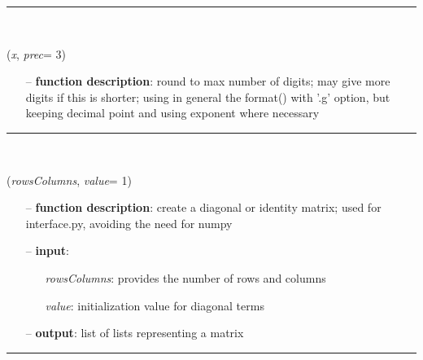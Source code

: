 \begin{itemize}[leftmargin=1.4cm]
\begin{itemize}[leftmargin=1.4cm]
\begin{itemize}[leftmargin=1.4cm]
\begin{itemize}[leftmargin=0.5cm]
%
\noindent\rule{8cm}{0.75pt}\vspace{1pt} \\ 
\begin{flushleft}
\label{sec:basicUtilities:SmartRound2String}
({\it x}, {\it prec}= 3)
\end{flushleft}
\setlength{\itemindent}{0.7cm}
\begin{itemize}[leftmargin=0.7cm]
\item[--]
{\bf function description}: round to max number of digits; may give more digits if this is shorter; using in general the format() with '.g' option, but keeping decimal point and using exponent where necessary
\vspace{12pt}\end{itemize}
%
\noindent\rule{8cm}{0.75pt}\vspace{1pt} \\ 
\begin{flushleft}
\label{sec:basicUtilities:DiagonalMatrix}
({\it rowsColumns}, {\it value}= 1)
\end{flushleft}
\setlength{\itemindent}{0.7cm}
\begin{itemize}[leftmargin=0.7cm]
\item[--]
{\bf function description}: create a diagonal or identity matrix; used for interface.py, avoiding the need for numpy
\item[--]
{\bf input}: \vspace{-6pt}
\begin{itemize}[leftmargin=1.2cm]
\setlength{\itemindent}{-0.7cm}
\item[]{\it rowsColumns}: provides the number of rows and columns
\item[]{\it value}: initialization value for diagonal terms
\end{itemize}
\item[--]
{\bf output}: list of lists representing a matrix
\vspace{12pt}\end{itemize}
%
\noindent\rule{8cm}{0.75pt}\vspace{1pt} \\ 
\begin{flushleft}
\label{sec:basicUtilities:NormL2}

\end{flushleft}
\end{itemize}
\end{itemize}
\end{itemize}
\end{itemize}
